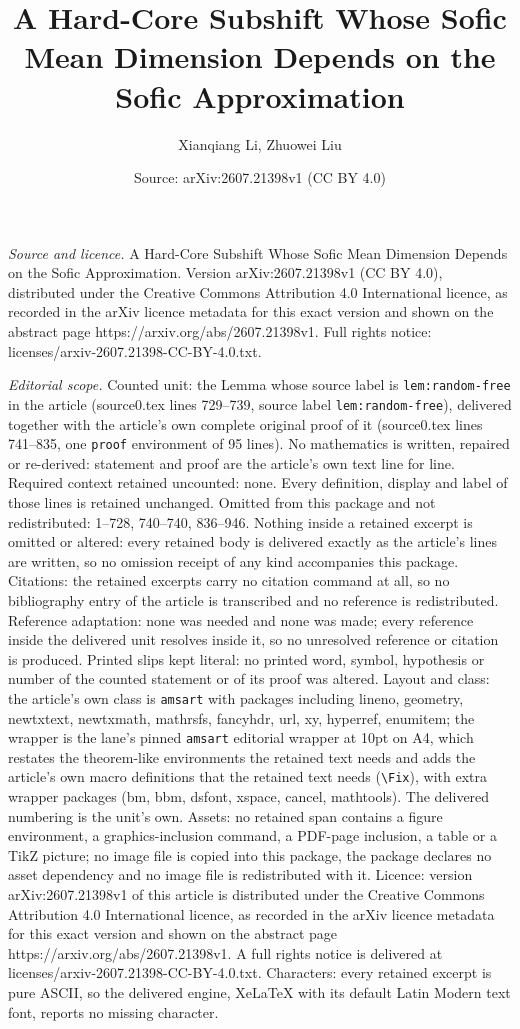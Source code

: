 \documentclass[10pt,a4paper]{amsart}
\title[A Hard-Core Subshift Whose Sofic Mean Dimension Depends on t]{A Hard-Core Subshift Whose Sofic Mean Dimension Depends on the Sofic Approximation}
\author{Xianqiang Li, Zhuowei Liu}
\date{Source: arXiv:2607.21398v1 (CC BY 4.0)}
\begin{document}
\maketitle

\noindent\emph{Source and licence.} A Hard-Core Subshift Whose Sofic Mean Dimension Depends on the Sofic Approximation. Version arXiv:2607.21398v1 (CC BY 4.0), distributed under the Creative Commons Attribution 4.0 International licence, as recorded in the arXiv licence metadata for this exact version and shown on the abstract page https://arxiv.org/abs/2607.21398v1. Full rights notice: licenses/arxiv-2607.21398-CC-BY-4.0.txt.\par\smallskip

\noindent\textit{Editorial scope.} Counted unit: the Lemma whose source label is \texttt{lem:random-free} in the article (source0.tex lines 729--739, source label \texttt{lem:random-free}), delivered together with the article's own complete original proof of it (source0.tex lines 741--835, one \texttt{proof} environment of 95 lines). No mathematics is written, repaired or re-derived: statement and proof are the article's own text line for line. Required context retained uncounted: none. Every definition, display and label of those lines is retained unchanged. Omitted from this package and not redistributed: 1--728, 740--740, 836--946. Nothing inside a retained excerpt is omitted or altered: every retained body is delivered exactly as the article's lines are written, so no omission receipt of any kind accompanies this package. Citations: the retained excerpts carry no citation command at all, so no bibliography entry of the article is transcribed and no reference is redistributed. Reference adaptation: none was needed and none was made; every reference inside the delivered unit resolves inside it, so no unresolved reference or citation is produced. Printed slips kept literal: no printed word, symbol, hypothesis or number of the counted statement or of its proof was altered. Layout and class: the article's own class is \texttt{amsart} with packages including lineno, geometry, newtxtext, newtxmath, mathrsfs, fancyhdr, url, xy, hyperref, enumitem; the wrapper is the lane's pinned \texttt{amsart} editorial wrapper at 10pt on A4, which restates the theorem-like environments the retained text needs and adds the article's own macro definitions that the retained text needs (\texttt{\textbackslash Fix}), with extra wrapper packages (bm, bbm, dsfont, xspace, cancel, mathtools). The delivered numbering is the unit's own. Assets: no retained span contains a figure environment, a graphics-inclusion command, a PDF-page inclusion, a table or a TikZ picture; no image file is copied into this package, the package declares no asset dependency and no image file is redistributed with it. Licence: version arXiv:2607.21398v1 of this article is distributed under the Creative Commons Attribution 4.0 International licence, as recorded in the arXiv licence metadata for this exact version and shown on the abstract page https://arxiv.org/abs/2607.21398v1. A full rights notice is delivered at licenses/arxiv-2607.21398-CC-BY-4.0.txt. Characters: every retained excerpt is pure ASCII, so the delivered engine, XeLaTeX with its default Latin Modern text font, reports no missing character.
\end{document}
